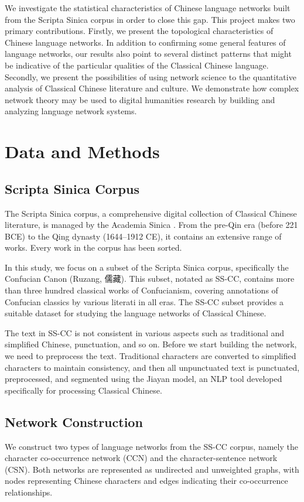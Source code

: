 \documentclass[11pt]{article}
\begin{document}
We investigate the statistical characteristics of Chinese language networks built from the Scripta Sinica corpus in order to close this gap. 
This project makes two primary contributions. Firstly, we present the topological characteristics of Chinese language networks. In addition to confirming some general features of language networks, our results also point to several distinct patterns that might be indicative of the particular qualities of the Classical Chinese language. Secondly, we present the possibilities of using network science to the quantitative analysis of Classical Chinese literature and culture. We demonstrate how complex network theory may be used to digital humanities research by building and analyzing language network systems.

\section{Data and Methods}

\subsection{Scripta Sinica Corpus}
The Scripta Sinica corpus, a comprehensive digital collection of Classical Chinese literature, is managed by the Academia Sinica \cite{ScriptaSinica}. From the pre-Qin era (before 221 BCE) to the Qing dynasty (1644–1912 CE), it contains an extensive range of works. Every work in the corpus has been sorted.

In this study, we focus on a subset of the Scripta Sinica corpus,  specifically the Confucian Canon (Ruzang, 儒藏). This subset, notated as SS-CC, contains more than three hundred classical works of Confucianism, covering annotations of Confucian classics by various literati in all eras. The SS-CC subset provides a suitable dataset for studying the language networks of Classical Chinese.

The text in SS-CC is not consistent in various aspects such as traditional and simplified Chinese, punctuation, and so on. Before we start building the network, we need to preprocess the text. Traditional characters are converted to simplified characters to maintain consistency, and then all unpunctuated text is punctuated, preprocessed, and segmented using the Jiayan model, an NLP tool developed specifically for processing Classical Chinese.

\subsection{Network Construction}
We construct two types of language networks from the SS-CC corpus, namely the character co-occurrence network (CCN) and the character-sentence network (CSN). Both networks are represented as undirected and unweighted graphs, with nodes representing Chinese characters and edges indicating their co-occurrence relationships.
\end{document}
